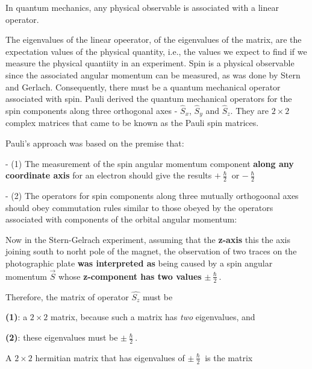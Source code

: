 \documentclass{article}
\begin{document}
In quantum mechanics, any physical observable is associated with a linear operator.

The eigenvalues of the linear opeerator, of the eigenvalues of the matrix, are the expectation values of the physical quantity, i.e., the values we expect to find if we measure the physical quantiity in an experiment. Spin is a physical observable since the associated angular momentum can be measured, as was done by Stern and Gerlach. Consequently, there must be a quantum mechanical operator associated with spin. Pauli derived the quantum mechanical operators for the spin components along three orthogonal axes - $\hat{S}_x$, $\hat{S}_y$ and $\hat{S}_z$. They are $2\times 2$ complex matrices that came to be known as the Pauli spin matrices.

Pauli's approach was based on the premise that:

- (1) The measurement of the spin angular momentum component \textbf{along any coordinate axis} for an electron should give the results $+ \frac{\hslash}{2}$ or $- \frac{\hslash}{2}$

- (2) The operators for spin components along three mutually orthogoonal axes should obey commutation rules similar to those obeyed by the operators associated with components of the orbital angular momentum:



Now in the Stern-Gelrach experiment, assuming that the \textbf{z-axis} this the axis joining south to norht pole of the magnet, the observation of two traces on the photographic plate \textbf{was interpreted as} being caused by a spin angular momentum $\vec{S}$ whose \textbf{z-component has two values} $\pm \frac{\hslash}{2}$.

Therefore, the matrix of operator $\hat{S_z}$ must be

\textbf{(1)}: a $2\times 2$ matrix, because such a matrix has \textit{two} eigenvalues, and

\textbf{(2)}: these eigenvalues must be $\pm \frac{\hslash}{2}$.

A $2\times 2$ hermitian matrix that has eigenvalues of $\pm \frac{\hslash}{2}$ is the matrix
\end{document}
